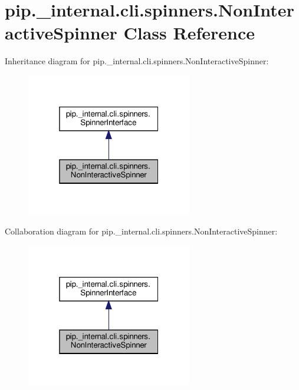\hypertarget{classpip_1_1__internal_1_1cli_1_1spinners_1_1NonInteractiveSpinner}{}\section{pip.\+\_\+internal.\+cli.\+spinners.\+Non\+Interactive\+Spinner Class Reference}
\label{classpip_1_1__internal_1_1cli_1_1spinners_1_1NonInteractiveSpinner}


Inheritance diagram for pip.\+\_\+internal.\+cli.\+spinners.\+Non\+Interactive\+Spinner\+:
\nopagebreak
\begin{figure}[H]
\begin{center}
\leavevmode
\includegraphics[width=205pt]{classpip_1_1__internal_1_1cli_1_1spinners_1_1NonInteractiveSpinner__inherit__graph}
\end{center}
\end{figure}


Collaboration diagram for pip.\+\_\+internal.\+cli.\+spinners.\+Non\+Interactive\+Spinner\+:
\nopagebreak
\begin{figure}[H]
\begin{center}
\leavevmode
\includegraphics[width=205pt]{classpip_1_1__internal_1_1cli_1_1spinners_1_1NonInteractiveSpinner__coll__graph}
\end{center}
\end{figure}
